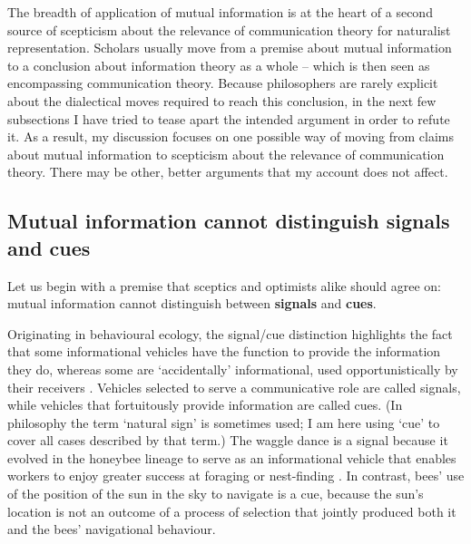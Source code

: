 
\noindent The breadth of application of mutual information is at the heart of a second source of scepticism about the relevance of communication theory for naturalist representation.
Scholars usually move from a premise about mutual information to a conclusion about information theory as a whole -- which is then seen as encompassing communication theory.
Because philosophers are rarely explicit about the dialectical moves required to reach this conclusion, in the next few subsections I have tried to tease apart the intended argument in order to refute it.
As a result, my discussion focuses on one possible way of moving from claims about mutual information to scepticism about the relevance of communication theory.
There may be other, better arguments that my account does not affect.

\subsection{Mutual information cannot distinguish signals and cues}

Let us begin with a premise that sceptics and optimists alike should agree on: mutual information cannot distinguish between \textbf{signals} and \textbf{cues}.

Originating in behavioural ecology, the signal/cue distinction highlights the fact that some informational vehicles have the function to provide the information they do, whereas some are `accidentally' informational, used opportunistically by their receivers \citep[$\S$1.2]{maynardsmith2003animal}.
Vehicles selected to serve a communicative role are called signals, while vehicles that fortuitously provide information are called cues.
(In philosophy the term `natural sign' is sometimes used; I am here using `cue' to cover all cases described by that term.)
The waggle dance is a signal because it evolved in the honeybee lineage to serve as an informational vehicle that enables workers to enjoy greater success at foraging or nest-finding \citep{gould1975honey,riley2005flight}.
In contrast, bees' use of the position of the sun in the sky to navigate is a cue, because the sun's location is not an outcome of a process of selection that jointly produced both it and the bees' navigational behaviour.

